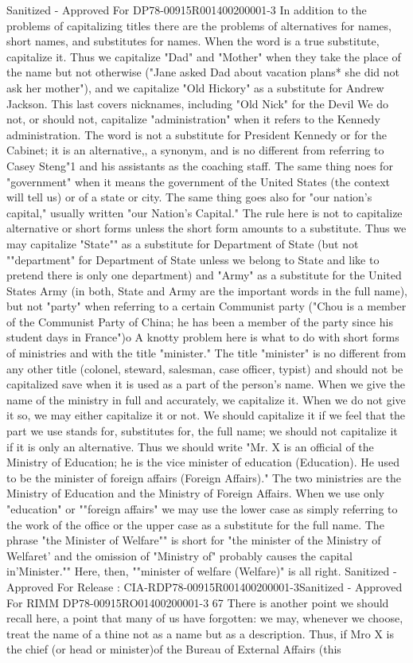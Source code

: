 \documentclass[
    oneside,
    11pt,
    draft
]{memoir}
\begin{document}
Sanitized - Approved For DP78-00915R001400200001-3 In addition to the problems of capitalizing titles there are the problems of alternatives for names, short names, and substitutes for names. When the word is a true substitute, capitalize it. Thus we capitalize "Dad" and "Mother" when they take the place of the name but not otherwise ("Jane asked Dad about vacation plans* she did not ask her mother"), and we capitalize "Old Hickory" as a substitute for Andrew Jackson. This last covers nicknames, including "Old Nick" for the Devil We do not, or should not, capitalize "administration" when it refers to the Kennedy administration. The word is not a substitute for President Kennedy or for the Cabinet; it is an alternative,, a synonym, and is no different from referring to Casey Steng"1 and his assistants as the coaching staff. The same thing noes for "government" when it means the government of the United States (the context will tell us) or of a state or city. The same thing goes also for "our nation's capital," usually written "our Nation's Capital." The rule here is not to capitalize alternative or short forms unless the short form amounts to a substitute. Thus we may capitalize "State"" as a substitute for Department of State (but not ""department" for Department of State unless we belong to State and like to pretend there is only one department) and "Army" as a substitute for the United States Army (in both, State and Army are the important words in the full name), but not "party" when referring to a certain Communist party ("Chou is a member of the Communist Party of China; he has been a member of the party since his student days in France")o A knotty problem here is what to do with short forms of ministries and with the title "minister." The title "minister" is no different from any other title (colonel, steward, salesman, case officer, typist) and should not be capitalized save when it is used as a part of the person's name. When we give the name of the ministry in full and accurately, we capitalize it. When we do not give it so, we may either capitalize it or not. We should capitalize it if we feel that the part we use stands for, substitutes for, the full name; we should not capitalize it if it is only an alternative. Thus we should write "Mr. X is an official of the Ministry of Education; he is the vice minister of education (Education). He used to be the minister of foreign affairs (Foreign Affairs)." The two ministries are the Ministry of Education and the Ministry of Foreign Affairs. When we use only "education" or ""foreign affairs" we may use the lower case as simply referring to the work of the office or the upper case as a substitute for the full name. The phrase "the Minister of Welfare"" is short for "the minister of the Ministry of Welfaret' and the omission of "Ministry of" probably causes the capital in'Minister."" Here, then, ""minister of welfare (Welfare)" is all right. Sanitized - Approved For Release : CIA-RDP78-00915R001400200001-3Sanitized - Approved For RIMM DP78-00915RO01400200001-3 67 There is another point we should recall here, a point that many of us have forgotten: we may, whenever we choose, treat the name of a thine not as a name but as a description. Thus, if Mro X is the chief (or head or minister)of the Bureau of External Affairs (this 
\end{document}
